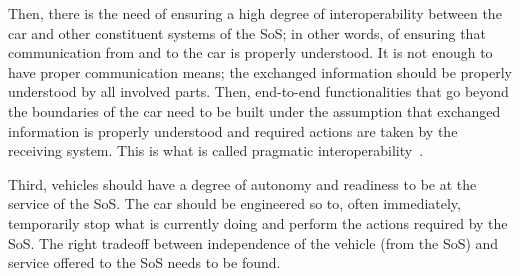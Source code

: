 
Then, there is the need of ensuring a high degree of interoperability between the car and other constituent systems of the SoS; in other words, of ensuring that 
communication from and to the car is properly understood. It is not enough to have proper communication means; the exchanged information should be properly understood by all involved parts. Then, end-to-end functionalities that go beyond the boundaries of the car need to be built under the assumption that exchanged information is properly understood and required actions are taken by the receiving system. This is what is called pragmatic interoperability~\cite{intero}.


Third, vehicles should have a degree of autonomy and readiness to be at the service of the SoS. 
The car should be engineered so to, often immediately, temporarily stop what is currently doing and 
perform the actions required by the SoS. The right tradeoff between independence of the vehicle (from the SoS) and service offered to the SoS needs to be found.


